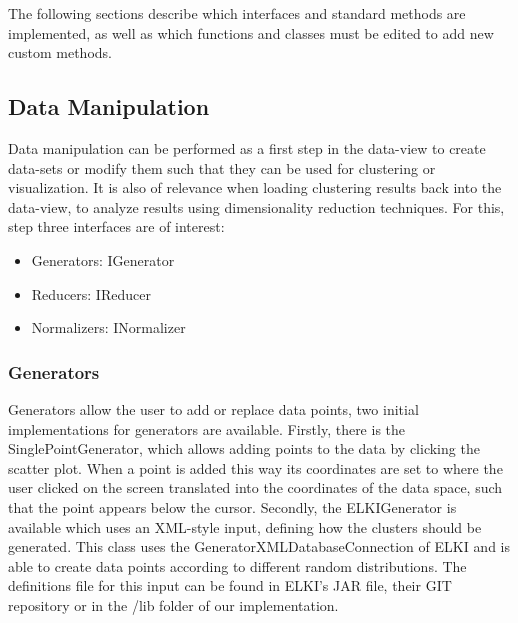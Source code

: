 \documentclass[
	a4paper,
	english,
	twoside,
	openright,               
	11pt                            
	]{report}
\begin{document}
The following sections describe which interfaces and standard methods are implemented, as well as which functions and classes must be edited to add new custom methods.

\subsection{Data Manipulation}

Data manipulation can be performed as a first step in the data-view to create data-sets or modify them such that they can be used for clustering or visualization. It is also of relevance when loading clustering results back into the data-view, to analyze results using dimensionality reduction techniques. For this, step three interfaces are of interest:

\begin{itemize}
  \item Generators: IGenerator
  \item Reducers: IReducer
  \item Normalizers: INormalizer
\end{itemize}

\subsubsection{Generators}
Generators allow the user to add or replace data points, two initial implementations for generators are available. Firstly, there is the SinglePointGenerator, which allows adding points to the data by clicking the scatter plot. When a point is added this way its coordinates are set to where the user clicked on the screen translated into the coordinates of the data space, such that the point appears below the cursor. Secondly, the ELKIGenerator is available which uses an XML-style input, defining how the clusters should be generated. This class uses the GeneratorXMLDatabaseConnection of ELKI \cite{10.1007/978-3-540-69497-7_41} and is able to create data points according to different random distributions. The definitions file for this input can be found in ELKI's JAR file, their GIT repository \cite{elkixml} or in the /lib folder of our implementation.

\end{document}
